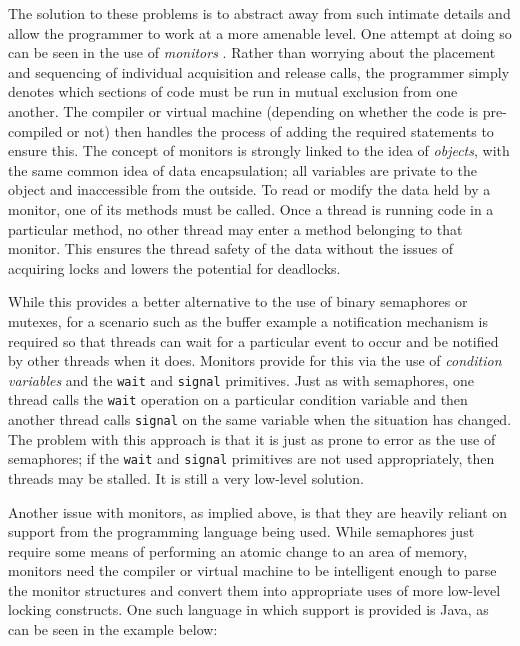 The solution to these problems is to abstract away from such intimate
details and allow the programmer to work at a more amenable level.
One attempt at doing so can be seen in the use of \emph{monitors}
\cite{mon1, mon2}.  Rather than worrying about the placement and
sequencing of individual acquisition and release calls, the programmer
simply denotes which sections of code must be run in mutual exclusion
from one another.  The compiler or virtual machine (depending on
whether the code is pre-compiled or not) then handles the process of
adding the required statements to ensure this.  The concept of
monitors is strongly linked to the idea of \emph{objects}, with the
same common idea of data encapsulation; all variables are private to
the object and inaccessible from the outside.  To read or modify the
data held by a monitor, one of its methods must be called.  Once a
thread is running code in a particular method, no other thread may
enter a method belonging to that monitor.  This ensures the thread
safety of the data without the issues of acquiring locks and lowers
the potential for deadlocks.

While this provides a better alternative to the use of binary
semaphores or mutexes, for a scenario such as the buffer example a
notification mechanism is required so that threads can wait for a
particular event to occur and be notified by other threads when it
does.  Monitors provide for this via the use of \emph{condition
  variables} and the \texttt{wait} and \texttt{signal} primitives.
Just as with semaphores, one thread calls the \texttt{wait} operation
on a particular condition variable and then another thread calls
\texttt{signal} on the same variable when the situation has changed.
The problem with this approach is that it is just as prone to error as
the use of semaphores; if the \texttt{wait} and \texttt{signal}
primitives are not used appropriately, then threads may be stalled.
It is still a very low-level solution.

Another issue with monitors, as implied above, is that they are
heavily reliant on support from the programming language being used.
While semaphores just require some means of performing an atomic
change to an area of memory, monitors need the compiler or virtual
machine to be intelligent enough to parse the monitor structures and
convert them into appropriate uses of more low-level locking
constructs.  One such language in which support is provided is Java,
as can be seen in the example below:

